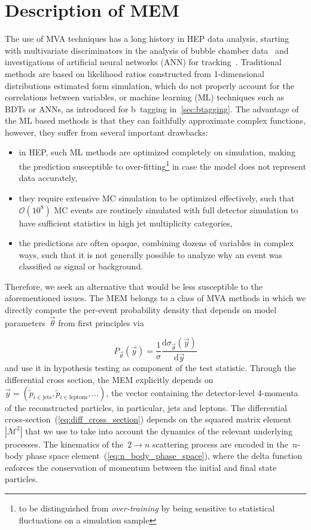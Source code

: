 \section{Description of MEM}
The use of MVA techniques has a long history in HEP data analysis, starting with multivariate discriminators in the analysis of bubble chamber data~\cite{VanDoninck:1984wd} and investigations of artificial neural networks (ANN) for tracking~\cite{Denby:1987rk}. Traditional methods are based on likelihood ratios constructed from 1-dimensional distributions estimated form simulation, which do not properly account for the correlations between variables, or machine learning (ML) techniques such as BDTs or ANNs, as introduced for b~tagging in~\cref{sec:btagging}. The advantage of the ML based methods is that they can faithfully approximate complex functions, however, they suffer from several important drawbacks:

\begin{itemize}
\item in HEP, such ML methods are optimized completely on simulation, making the prediction susceptible to over-fitting\footnote{to be distinguished from \textit{over-training} by being sensitive to statistical fluctuations on a simulation sample} in case the model does not represent data accurately,
\item they require extensive MC simulation to be optimized effectively, such that $\mathcal{O}(10^8)$ MC events are routinely simulated with full detector simulation to have sufficient statistics in high jet multiplicity categories,
\item the predictions are often opaque, combining dozens of variables in complex ways, such that it is not generally possible to analyze why an event was classified as signal or background.
\end{itemize}
Therefore, we seek an alternative that would be less susceptible to the aforementioned issues. The MEM belongs to a class of MVA methods in which we directly compute the per-event probability density that depends on model parameters~$\vec{\theta}$ from first principles via

\begin{equation}
P_{\vec{\theta}}(\vec{y}) = \frac{1}{\sigma}
\frac{\mathrm{d}\sigma_{\vec{\theta}}(\vec{y})}{\mathrm{d}\vec{y}}
\end{equation}
and use it in hypothesis testing as component of the test statistic. Through the differential cross section, the MEM explicitly depends on~$\vec{y} = (\tilde{p}_{i \in \mathrm{jets}}, \tilde{p}_{i \in \mathrm{leptons}}, \dots)$, the vector containing the detector-level 4-momenta of the reconstructed particles, in particular, jets and leptons. The differential cross-section~(\cref{eq:diff_cross_section}) depends on the squared matrix element~$|\mathcal{M}^2|$ that we use to take into account the dynamics of the relevant underlying processes. The kinematics of the~$2 \rightarrow n$ scattering process are encoded in the~$n$-body phase space element~(\cref{eq:n_body_phase_space}), where the delta function enforces the conservation of momentum between the initial and final state particles.

